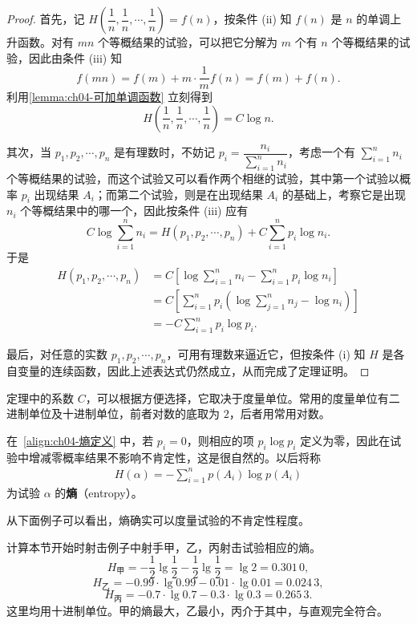 \documentclass[../../main.tex]{subfiles}
\begin{document}
\begin{proof}
首先，记 $H\left(\dfrac{1}{n},\dfrac{1}{n},\cdots,\dfrac{1}{n}\right)=f(n)$，按条件 (ii) 知 $f(n)$ 是 $n$ 的单调上升函数。对有 $mn$ 个等概结果的试验，可以把它分解为 $m$ 个有 $n$ 个等概结果的试验，因此由条件 (iii) 知
\[
f(mn)=f(m)+m\cdot\frac{1}{m}f(n)=f(m)+f(n).
\]
利用\cref{lemma:ch04-可加单调函数} 立刻得到
\[
H\left(\frac{1}{n},\frac{1}{n},\cdots,\frac{1}{n}\right)=C\log n.
\]

其次，当 $p_1,p_2,\cdots,p_n$ 是有理数时，不妨记 $p_i=\dfrac{n_i}{\sum_{i=1}^n n_i}$，考虑一个有 $\sum_{i=1}^n n_i$ 个等概结果的试验，而这个试验又可以看作两个相继的试验，其中第一个试验以概率 $p_i$ 出现结果 $A_i$；而第二个试验，则是在出现结果 $A_i$ 的基础上，考察它是出现 $n_i$ 个等概结果中的哪一个，因此按条件 (iii) 应有
\[
C\log\sum_{i=1}^n n_i=H(p_1,p_2,\cdots,p_n)+C\sum_{i=1}^n p_i\log n_i.
\]
于是
\begin{align*}
H(p_1,p_2,\cdots,p_n)&=C\left[\log\sum_{i=1}^n n_i-\sum_{i=1}^n p_i\log n_i\right]\\
&=C\left[\sum_{i=1}^n p_i\left(\log\sum_{j=1}^n n_j-\log n_i\right)\right]\\
&=-C\sum_{i=1}^n p_i\log p_i.
\end{align*}

最后，对任意的实数 $p_1,p_2,\cdots,p_n$，可用有理数来逼近它，但按条件 (i) 知 $H$ 是各自变量的连续函数，因此上述表达式仍然成立，从而完成了定理证明。
\end{proof}

定理中的系数 $C$，可以根据方便选择，它取决于度量单位。常用的度量单位有二进制单位及十进制单位，前者对数的底取为 $2$，后者用常用对数。

在~\eqref{align:ch04-熵定义} 中，若 $p_i=0$，则相应的项 $p_i\log p_i$ 定义为零，因此在试验中增减零概率结果不影响不肯定性，这是很自然的。以后将称
\begin{align}
H(\alpha)=-\sum_{i=1}^n p(A_i)\log p(A_i)\label{align:ch04-熵定义2}
\end{align}
为试验 $\alpha$ 的\textbf{熵}（entropy）。

从下面例子可以看出，熵确实可以度量试验的不肯定性程度。

\begin{example}[射手射击的熵]\label{example:ch04-射手熵}
计算本节开始时射击例子中射手甲，乙，丙射击试验相应的熵。
\[
H_{\text{甲}}=-\frac12\lg\frac12-\frac12\lg\frac12=\lg 2=0.301\,0,
\]
\[
H_{\text{乙}}=-0.99\cdot\lg 0.99-0.01\cdot\lg 0.01=0.024\,3,
\]
\[
H_{\text{丙}}=-0.7\cdot\lg 0.7-0.3\cdot\lg 0.3=0.265\,3.
\]
这里均用十进制单位。甲的熵最大，乙最小，丙介于其中，与直观完全符合。
\end{example}
\end{document}
